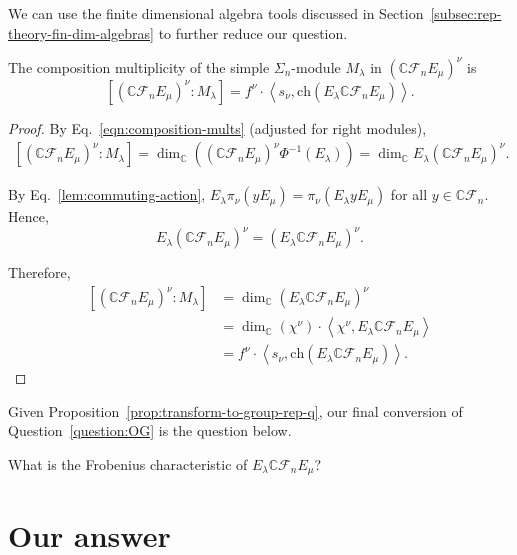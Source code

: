 \documentclass[ALCO, Unicode]{cedram}
\def\ch{\mathrm{ch}}
\def\C{{\mathbb{C}}}
\def\ch{\mathrm{ch}}
\begin{document}
We can use the finite dimensional algebra tools discussed in Section~\ref{subsec:rep-theory-fin-dim-algebras} to further reduce our question. 

\begin{prop}\label{prop:transform-to-group-rep-q}
The composition multiplicity of the simple $\Sigma_n$-module $M_{\lambda}$ in $\left(\C \mathcal{F}_n E_{\mu}\right)^{\nu}$ is 
    \[\left[(\C \mathcal{F}_nE_{\mu})^{\nu}:M_{\lambda}\right] = f^\nu \cdot \left \langle s_\nu, \ch \left(E_{\lambda}\C \mathcal{F}_n E_{\mu}\right) \right \rangle.\]
\end{prop}

\begin{proof}
By Eq.~\eqref{eqn:composition-mults} (adjusted for right modules), 
\begin{align*}
    \left[(\C \mathcal{F}_nE_{\mu})^{\nu}:M_{\lambda}\right] 
    = \dim_{\C} \left((\C \mathcal{F}_nE_{\mu})^{\nu} \Phi^{-1}(E_\lambda) \right)= \dim_{\C} E_{\lambda}\left(\C \mathcal{F}_n E_{\mu}\right)^{\nu}.
\end{align*}

By Eq.~\eqref{lem:commuting-action},  $E_\lambda \pi_\nu \left(y E_\mu\right) = \pi_\nu \left(E_\lambda yE_\mu\right)$ for all $y \in \C \mathcal{F}_n.$ Hence,
\[E_{\lambda}\left(\C \mathcal{F}_n E_{\mu}\right)^\nu = \left(E_{\lambda}\C \mathcal{F}_n E_{\mu}\right)^\nu.\]

Therefore,
\begin{align*}
    \left[(\C \mathcal{F}_nE_{\mu})^{\nu}:M_\lambda\right] &= \dim_\C \left(E_\lambda\C \mathcal{F}_n E_{\mu}\right)^{\nu}\\
    &= \dim_\C \left(\chi^\nu \right) \cdot \left \langle\chi^\nu, E_{\lambda}\C \mathcal{F}_n E_{\mu}  \right \rangle\\
    &= f^\nu \cdot \left \langle s_\nu, \ch \left (E_\lambda \C \mathcal{F}_n E_\mu \right)\right \rangle.
\end{align*}
\end{proof}


Given Proposition~\ref{prop:transform-to-group-rep-q}, our final conversion of Question~\ref{question:OG} is the question below.

\begin{question}\label{quest:sn-rep-structure}
    What is the Frobenius characteristic of $E_\lambda \C\mathcal{F}_nE_\mu$?
\end{question}
\section{Our answer}\label{sec:full-answer}
\end{document}
